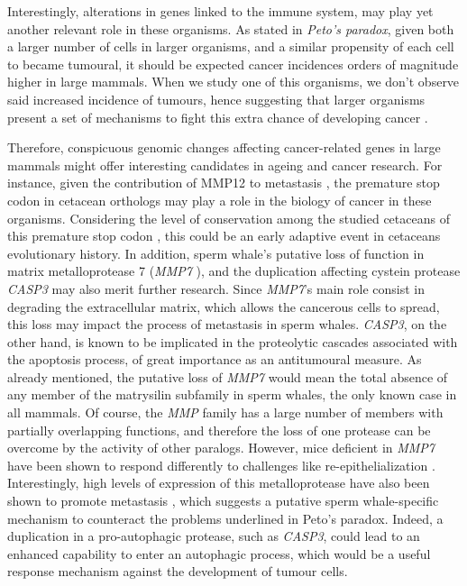 Interestingly, alterations in genes linked to the immune system, may play yet another relevant role in these  organisms.
As stated in \emph{Peto's paradox}, given both a larger number of cells in larger organisms, and a similar propensity of each cell to became tumoural, it should be expected cancer incidences orders of magnitude higher in large mammals. %
When we study one of this  organisms, we don't observe said increased incidence of tumours, hence suggesting that larger organisms present a set of mechanisms to fight this extra chance of developing cancer \cite{Caulin2011b}.

Therefore, conspicuous genomic changes affecting cancer-related genes in large mammals might offer interesting candidates in ageing and cancer research.
For instance, given the contribution of MMP12 to metastasis \cite{Lv2015}, the premature stop codon in cetacean orthologs may play a role in the biology of cancer in these organisms.
Considering the level of conservation among the studied cetaceans of this premature stop codon%
, this could be an early adaptive event in cetaceans evolutionary history.
In addition, sperm whale's putative loss of function in matrix metalloprotease 7 (\textit{MMP7}%
), and the duplication affecting cystein protease \textit{CASP3} %
may also merit further research.
Since \textit{MMP7}'s main role consist in degrading the extracellular matrix, which allows the cancerous cells to spread, this loss may impact the process of metastasis in sperm whales.
\textit{CASP3}, on the other hand, is known to be implicated in the proteolytic cascades associated with the apoptosis process, of great importance as an antitumoural measure.
As already mentioned, the putative loss of \textit{MMP7} would mean the total absence of any member of the matrysilin subfamily in sperm whales, the only known case in all mammals.
Of course, the \textit{MMP} family has a large number of members with partially overlapping functions, and therefore the loss of one protease can be overcome by the activity of other paralogs.
However, mice deficient in \textit{MMP7} have been shown to respond differently to challenges like re-epithelialization \cite{Swee2008}.
Interestingly, high levels of expression of this metalloprotease have also been shown to promote metastasis \cite{Li2014a,Koskensalo2011}, which suggests a putative sperm whale-specific mechanism to counteract the problems underlined in Peto’s paradox.
Indeed, a duplication in a pro-autophagic protease, such as \textit{CASP3}, could lead to an enhanced capability to enter an autophagic process, which would be a useful response mechanism against the development of tumour cells.

